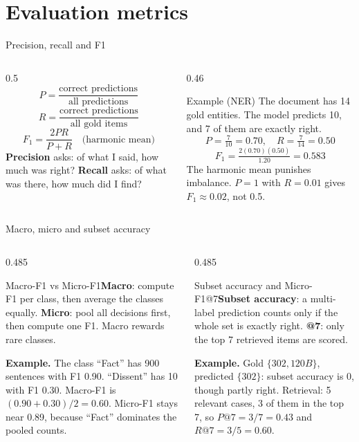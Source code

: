 \documentclass[aspectratio=169,11pt]{beamer}
\newcommand{\term}[3]{%
  \begin{block}{#1}\small #2\par\vspace{1mm}%
  {\color{exgreen}\textbf{Example.}} #3\end{block}}
\newcommand{\twoterms}[6]{%
  \begin{columns}[T]
    \begin{column}{0.485\textwidth}\term{#1}{#2}{#3}\end{column}
    \begin{column}{0.485\textwidth}\term{#4}{#5}{#6}\end{column}
  \end{columns}}
\begin{document}
\section{Evaluation metrics}

\begin{frame}{Precision, recall and F1}
  \begin{columns}[T]
    \begin{column}{0.5\textwidth}
      \small
      \[ P=\frac{\text{correct predictions}}{\text{all predictions}} \]
      \[ R=\frac{\text{correct predictions}}{\text{all gold items}} \]
      \[
        F_1=\frac{2PR}{P+R}\quad\text{(harmonic mean)}
      \]
      \textbf{Precision} asks: of what I said, how much was right?
      \textbf{Recall} asks: of what was there, how much did I find?
    \end{column}
    \begin{column}{0.46\textwidth}
      \begin{exampleblock}{Example (NER)}
        \small
        The document has 14 gold entities. The model predicts 10, and 7 of them are exactly right.
        \[
          P=\tfrac{7}{10}=0.70,\quad R=\tfrac{7}{14}=0.50
        \]
        \[
          F_1=\tfrac{2(0.70)(0.50)}{1.20}=0.583
        \]
        The harmonic mean punishes imbalance. $P=1$ with $R=0.01$ gives $F_1\approx0.02$, not 0.5.
      \end{exampleblock}
    \end{column}
  \end{columns}
\end{frame}

\begin{frame}{Macro, micro and subset accuracy}
  \twoterms{Macro-F1 vs Micro-F1}
  {\textbf{Macro}: compute F1 per class, then average the classes equally. \textbf{Micro}: pool all decisions first, then compute one F1. Macro rewards rare classes.}
  {The class ``Fact'' has 900 sentences with F1 0.90. ``Dissent'' has 10 with F1 0.30. Macro-F1 is $(0.90+0.30)/2=0.60$. Micro-F1 stays near 0.89, because ``Fact'' dominates the pooled counts.}
  {Subset accuracy and Micro-F1@7}
  {\textbf{Subset accuracy}: a multi-label prediction counts only if the whole set is exactly right. \textbf{@7}: only the top 7 retrieved items are scored.}
  {Gold $\{302,120B\}$, predicted $\{302\}$: subset accuracy is 0, though partly right. Retrieval: 5 relevant cases, 3 of them in the top 7, so $P@7=3/7=0.43$ and $R@7=3/5=0.60$.}
\end{frame}
\end{document}

